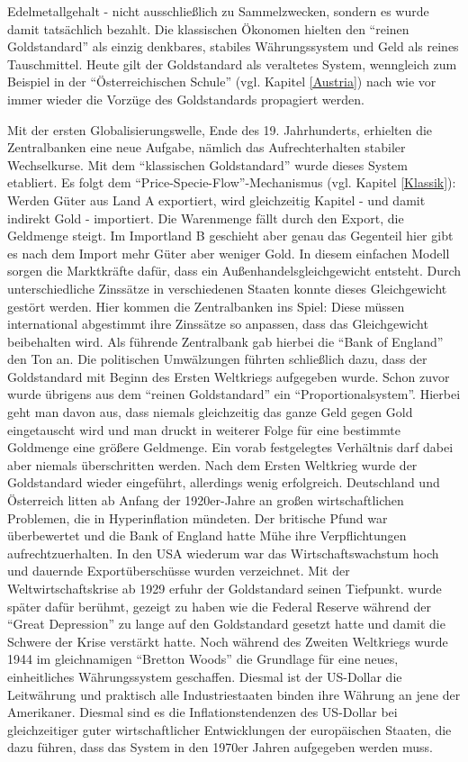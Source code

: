 Edelmetallgehalt - nicht ausschließlich zu Sammelzwecken, sondern es wurde damit tatsächlich bezahlt. Die klassischen Ökonomen hielten den "`reinen Goldstandard"' als einzig denkbares, stabiles Währungssystem und Geld als reines Tauschmittel. Heute gilt der Goldstandard als veraltetes System, wenngleich zum Beispiel in der "`Österreichischen Schule"' (vgl. Kapitel \ref{Austria}) nach wie vor immer wieder die Vorzüge des Goldstandards propagiert werden.  

Mit der ersten Globalisierungswelle, Ende des 19. Jahrhunderts, erhielten die Zentralbanken eine neue Aufgabe, nämlich das Aufrechterhalten stabiler Wechselkurse. Mit dem "`klassischen Goldstandard"' wurde dieses System etabliert. Es folgt dem "`Price-Specie-Flow"'-Mechanismus (vgl. Kapitel \ref{Klassik}): Werden Güter aus Land A exportiert, wird gleichzeitig Kapitel - und damit indirekt Gold - importiert. Die Warenmenge fällt durch den Export, die Geldmenge steigt. Im Importland B geschieht aber genau das Gegenteil hier gibt es nach dem Import mehr Güter aber weniger Gold. In diesem einfachen Modell sorgen die Marktkräfte dafür, dass ein Außenhandelsgleichgewicht entsteht. Durch unterschiedliche Zinssätze in verschiedenen Staaten konnte dieses Gleichgewicht gestört werden. Hier kommen die Zentralbanken ins Spiel: Diese müssen international abgestimmt ihre Zinssätze so anpassen, dass das Gleichgewicht beibehalten wird. Als führende Zentralbank gab hierbei die "`Bank of England"' den Ton an. Die politischen Umwälzungen führten schließlich dazu, dass der Goldstandard mit Beginn des Ersten Weltkriegs aufgegeben wurde. Schon zuvor wurde übrigens aus dem "`reinen Goldstandard"' ein "`Proportionalsystem"'. Hierbei geht man davon aus, dass niemals gleichzeitig das ganze Geld gegen Gold eingetauscht wird und man druckt in weiterer Folge für eine bestimmte Goldmenge eine größere Geldmenge. Ein vorab festgelegtes Verhältnis darf dabei aber niemals überschritten werden. Nach dem Ersten Weltkrieg wurde der Goldstandard wieder eingeführt, allerdings wenig erfolgreich. Deutschland und Österreich litten ab Anfang der 1920er-Jahre an großen wirtschaftlichen Problemen, die in Hyperinflation mündeten. Der britische Pfund war überbewertet und die Bank of England hatte Mühe ihre Verpflichtungen aufrechtzuerhalten. In den USA wiederum war das Wirtschaftswachstum hoch und dauernde Exportüberschüsse wurden verzeichnet. Mit der Weltwirtschaftskrise ab 1929 erfuhr der Goldstandard seinen Tiefpunkt. \textcite{Friedman1963} wurde später dafür berühmt, gezeigt zu haben wie die Federal Reserve während der "`Great Depression"' zu lange auf den Goldstandard gesetzt hatte und damit die Schwere der Krise verstärkt hatte. Noch während des Zweiten Weltkriegs wurde 1944 im gleichnamigen "`Bretton Woods"' die Grundlage für eine neues, einheitliches Währungssystem geschaffen. Diesmal ist der US-Dollar die Leitwährung und praktisch alle Industriestaaten binden ihre Währung an jene der Amerikaner. Diesmal sind es die Inflationstendenzen des US-Dollar bei gleichzeitiger guter wirtschaftlicher Entwicklungen der europäischen Staaten, die dazu führen, dass das System in den 1970er Jahren aufgegeben werden muss.


